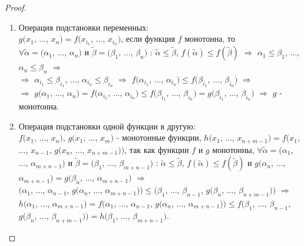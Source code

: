 \documentclass[a4paper, 12pt]{article}
\theoremstyle{definition}
\theoremstyle{plain}
\theoremstyle{remark}
\begin{document}
  \begin{proof}
    \begin{enumerate}
      \item Операция подстановки переменных:\\
      $g(x_1$, $\ldots$, $x_n)=f(x_{i_1}$, $\ldots$, $x_{i_n})$, если функция $f$ монотонна, то\\ $\forall\tilde{\alpha}=(\alpha_1$, $\ldots$, $\alpha_n)$ и $\tilde{\beta}=(\beta_1$, $\ldots$, $\beta_n)$ : $\tilde{\alpha}\leqslant\tilde{\beta}$, $f(\tilde{\alpha})\leqslant f(\tilde{\beta})$ $\Longrightarrow$ $\alpha_1\leqslant\beta_1$, $\ldots$, $\alpha_n\leqslant\beta_n$ $\Longrightarrow$\\
      $\Longrightarrow$ $\alpha_{i_1}\leqslant\beta_{i_1}$, $\ldots$, $\alpha_{i_n}\leqslant\beta_{i_n}$ $\Longrightarrow$ $f(\alpha_{i_1}$, $\ldots$, $\alpha_{i_n})\leqslant f(\beta_{i_1}$, $\ldots$, $\beta_{i_n})$ $\Longrightarrow$\\
      $\Longrightarrow$ $g(\alpha_{1}$, $\ldots$, $\alpha_{n})=f(\alpha_{i_1}$, $\ldots$, $\alpha_{i_n})\leqslant f(\beta_{i_1}$, $\ldots$, $\beta_{i_n})=g(\beta_{i_1}$, $\ldots$, $\beta_{i_n})$ $\Longrightarrow$ $g$ - монотонна.
      \item Операция подстановки одной функции в другую:\\ 
      $f(x_{1}$, $\ldots$, $x_{n})$, $g(x_{1}$, $\ldots$, $x_{m})$ - монотонные функции, $h(x_1$, $\ldots$, $x_{n+m-1})=f(x_1$, $\ldots$, $x_{n-1}$, $g(x_n$, $\ldots$, $x_{n+m-1}))$, так как функции $f$ и $g$ монотонны, $\forall\tilde{\alpha}=(\alpha_1$, $\ldots$, $\alpha_{m+n-1})$ и $\tilde{\beta}=(\beta_1$, $\ldots$, $\beta_{m+n-1})$ : $\tilde{\alpha}\leqslant\tilde{\beta}$, $f(\tilde{\alpha})\leqslant f(\tilde{\beta})$ и $g(\alpha_n$, $\ldots$, $\alpha_{m+n-1})=g(\beta_n$, $\ldots$, $\alpha_{m+n-1})$ $\Longrightarrow$\\
      $(\alpha_1$, $\ldots$, $\alpha_{n-1}$, $g(\alpha_n$, $\ldots$, $\alpha_{m+n-1}))\leqslant (\beta_1$, $\ldots$, $\beta_{n-1}$, $g(\beta_n$, $\ldots$, $\beta_{n+m-1}))$ $\Longrightarrow$ $h(\alpha_1$, $\ldots$, $\alpha_{m+n-1})=f(\alpha_1$, $\ldots$, $\alpha_{n-1}$, $g(\alpha_n$, $\ldots$, $\alpha_{m+n-1}))\leqslant f(\beta_1$, $\ldots$, $\beta_{n-1}$, $g(\beta_n$, $\ldots$, $\beta_{n+m-1}))=h(\beta_1$, $\ldots$, $\beta_{m+n-1})$.

\end{enumerate}
\end{proof}
\end{document}
